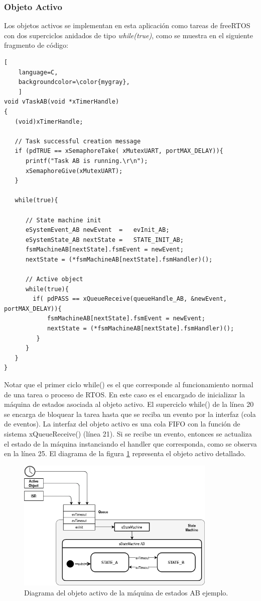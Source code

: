 \subsubsection{Objeto Activo}
	
Los objetos activos se implementan en esta aplicación como tareas de freeRTOS con dos superciclos anidados de tipo \textit{while(true)}, como se muestra en el siguiente fragmento de código: 

\begin{lstlisting}[
	language=C, 
	backgroundcolor=\color{mygray},
	]
void vTaskAB(void *xTimerHandle)
{
   (void)xTimerHandle;

   // Task successful creation message
   if (pdTRUE == xSemaphoreTake( xMutexUART, portMAX_DELAY)){
      printf("Task AB is running.\r\n");
      xSemaphoreGive(xMutexUART);
   }

   while(true){
      
      // State machine init
      eSystemEvent_AB newEvent	=	evInit_AB;
      eSystemState_AB nextState	=	STATE_INIT_AB;
      fsmMachineAB[nextState].fsmEvent = newEvent; 
      nextState = (*fsmMachineAB[nextState].fsmHandler)();

      // Active object
      while(true){
        if( pdPASS == xQueueReceive(queueHandle_AB, &newEvent, portMAX_DELAY)){
            fsmMachineAB[nextState].fsmEvent = newEvent; 
            nextState = (*fsmMachineAB[nextState].fsmHandler)();
         }
      }
   }
}
\end{lstlisting}

Notar que el primer ciclo while() es el que corresponde al funcionamiento normal de una tarea o proceso de RTOS. En este caso es el encargado de inicializar la máquina de estados asociada al objeto activo. El superciclo while() de la línea 20 se encarga de bloquear la tarea hasta que se reciba un evento por la interfaz (cola de eventos). La interfaz del objeto activo es una cola FIFO con la función de sistema xQueueReceive() (línea 21). Si se recibe un evento, entonces se actualiza el estado de la máquina instanciando el handler que corresponda, como se observa en la línea 25. El diagrama de la figura \ref{fig:AOfsmAB} representa el objeto activo detallado. 

\begin{figure}[ht]
	\centering
	\includegraphics[width=0.85\textwidth]{./Figures/AOstatemachineAB.png}
	\caption{Diagrama del objeto activo de la máquina de estados AB ejemplo.}
	\label{fig:AOfsmAB}
\end{figure}

